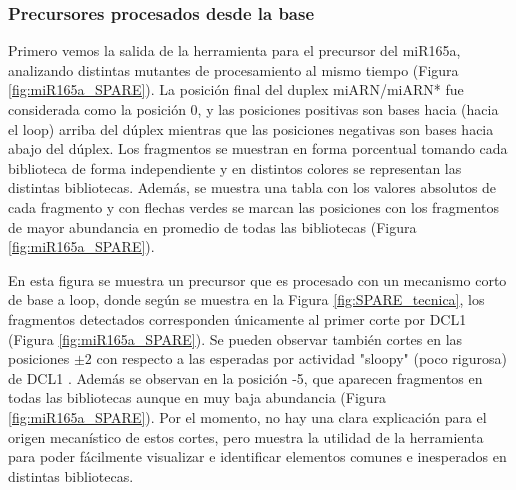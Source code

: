 \subsubsection{Precursores procesados desde la base}
Primero vemos la salida de la herramienta para el precursor del  miR165a, analizando distintas mutantes de procesamiento al mismo tiempo (Figura \ref{fig:miR165a_SPARE}).
La posición final del duplex miARN/miARN* fue considerada como la posición 0, y las posiciones positivas son bases hacia (hacia el loop) arriba del dúplex mientras que las posiciones negativas son bases hacia abajo del dúplex.
Los fragmentos se muestran en forma porcentual tomando cada biblioteca de forma independiente y en distintos colores se representan las distintas bibliotecas.
Además, se muestra una tabla con los valores absolutos de cada fragmento y con flechas verdes se marcan las posiciones con los fragmentos de mayor abundancia en promedio de todas las bibliotecas (Figura \ref{fig:miR165a_SPARE}).
 
En esta figura se muestra un precursor que es procesado con un mecanismo corto de base a loop, donde según se muestra en la Figura \ref{fig:SPARE_tecnica}, los fragmentos detectados corresponden únicamente al primer corte por DCL1 (Figura \ref{fig:miR165a_SPARE}).
Se pueden observar también cortes en las posiciones $\pm 2$ con respecto a las esperadas por actividad "sloopy" (poco rigurosa) de DCL1 \citep{pmid17989254}.
Además se observan en la posición -5, que aparecen fragmentos en todas las bibliotecas aunque en muy baja abundancia (Figura \ref{fig:miR165a_SPARE}).
Por el momento, no hay una clara explicación para el origen mecanístico de estos cortes, pero muestra la utilidad de la herramienta para poder fácilmente visualizar e identificar elementos comunes e inesperados en distintas bibliotecas.




